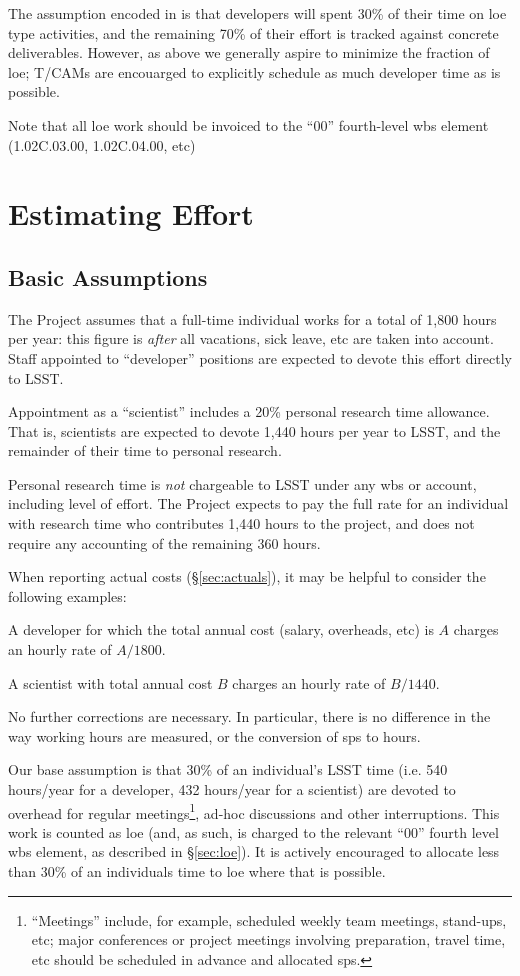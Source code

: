 The assumption encoded in  is that developers will spent 30\% of their time on \gls{loe} type activities, and the remaining 70\% of their effort is tracked against concrete deliverables.
However, as above we generally aspire to minimize the fraction of \gls{loe}; T/CAMs are encouarged to explicitly schedule as much developer time as is possible.

Note that all \gls{loe} work should be invoiced to the ``00'' fourth-level \gls{wbs} element (1.02C.03.00, 1.02C.04.00, etc)

\section{Estimating Effort}
\label{sec:effort}

\subsection{Basic Assumptions}
The Project assumes that a full-time individual works for a total of
1,800 hours per year: this figure is \emph{after} all vacations, sick
leave, etc are taken into account. Staff appointed to ``developer''
positions are expected to devote this effort directly to LSST.

Appointment as a ``scientist'' includes a 20\% personal research time
allowance. That is, scientists are expected to devote 1,440 hours per
year to LSST, and the remainder of their time to personal research.

Personal research time is \emph{not} chargeable to LSST under any \gls{wbs} or
account, including level of effort. The Project expects to pay the full
rate for an individual with research time who contributes 1,440 hours to
the project, and does not require any accounting of the remaining 360
hours.

When reporting actual costs (\S\ref{sec:actuals}), it may
be helpful to consider the following examples:

A developer for which the total annual cost (salary, overheads, etc) is
\(A\) charges an hourly rate of \(A / 1800\).

A scientist with total annual cost \(B\) charges an hourly rate of
\(B / 1440\).

No further corrections are necessary. In particular, there is no
difference in the way working hours are measured, or the conversion of
\glspl{sp} to hours.

Our base assumption is that 30\% of an individual's LSST time (i.e. 540 hours/year for a developer, 432 hours/year for a scientist) are devoted to overhead for regular meetings\footnote{``Meetings'' include, for example, scheduled weekly team meetings, stand-ups, etc; major conferences or project meetings involving preparation, travel time, etc should be scheduled in advance and allocated \glspl{sp}.}, ad-hoc discussions and other interruptions.
This work is counted as \gls{loe} (and, as such, is charged to the relevant ``00'' fourth level \gls{wbs} \gls{element}, as described in \S\ref{sec:loe}).
It is actively encouraged to allocate less than 30\% of an individuals time to \gls{loe} where that is possible.

